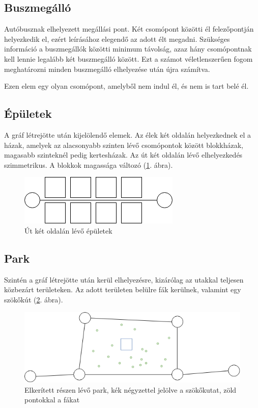 \subsection{Buszmegálló}

Autóbusznak elhelyezett megállási pont. Két csomópont közötti él felezőpontján helyezkedik el, ezért leírásához elegendő az adott élt megadni. Szükséges információ a buszmegállók közötti minimum távolság, azaz hány csomópontnak kell lennie legalább két buszmegálló között. Ezt a számot véletlenszerűen fogom meghatározni minden buszmegálló elhelyezése után újra számítva.

Ezen elem egy olyan csomópont, amelyből nem indul él, és nem is tart belé él.

\subsection{Épületek}

A gráf létrejötte után kijelölendő elemek. Az élek két oldalán helyezkednek el a házak, amelyek az alacsonyabb szinten lévő csomópontok között blokkházak, magasabb szinteknél pedig kertesházak. Az út két oldalán lévő elhelyezkedés szimmetrikus. A blokkok magassága változó (\ref{fig:builds}. ábra).

\begin{figure}[H]
\includegraphics[width=\linewidth]{epulet.png}
\caption{Út két oldalán lévő épületek}
\label{fig:builds}
\end{figure}

\subsection{Park}

Szintén a gráf létrejötte után kerül elhelyezésre, kizárólag az utakkal teljesen közbezárt területeken. Az adott területen belülre fák kerülnek, valamint egy szökőkút (\ref{fig:parkmodel}. ábra).

\begin{figure}[H]
\includegraphics[width=\linewidth]{park.png}
\caption{Elkerített részen lévő park, kék négyzettel jelölve a szökőkutat, zöld pontokkal a fákat}
\label{fig:parkmodel}
\end{figure}

